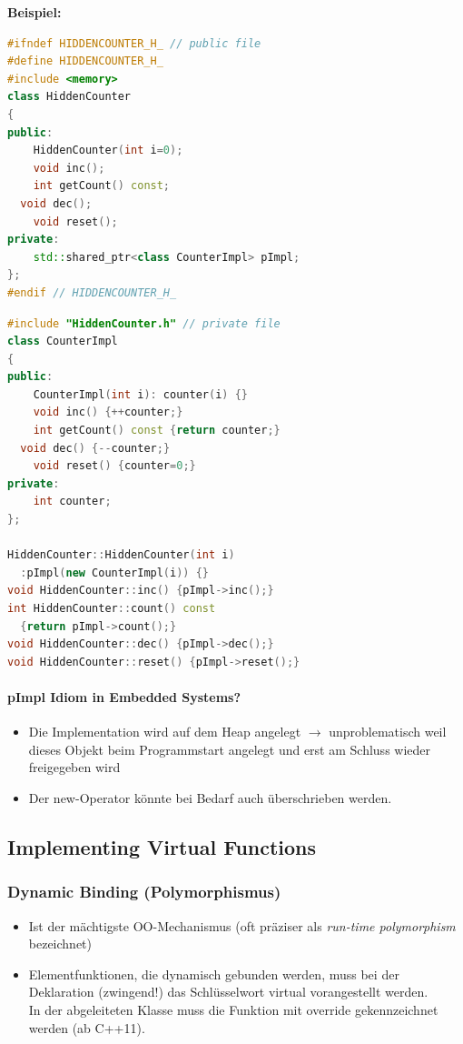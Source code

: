 \textbf{Beispiel:}
\begin{multicols}{2}
\begin{lstlisting}[language=C++]
#ifndef HIDDENCOUNTER_H_ // public file
#define HIDDENCOUNTER_H_
#include <memory>
class HiddenCounter
{
public:
	HiddenCounter(int i=0);
	void inc();
	int getCount() const;
  void dec();
	void reset();
private:
	std::shared_ptr<class CounterImpl> pImpl;
};
#endif // HIDDENCOUNTER_H_
\end{lstlisting}
\vfill\null
\columnbreak
\begin{lstlisting}[language=C++]
#include "HiddenCounter.h" // private file
class CounterImpl
{
public:
	CounterImpl(int i): counter(i) {}
	void inc() {++counter;}
	int getCount() const {return counter;}
  void dec() {--counter;}
	void reset() {counter=0;}
private:
	int counter;
};

HiddenCounter::HiddenCounter(int i)
  :pImpl(new CounterImpl(i)) {}
void HiddenCounter::inc() {pImpl->inc();}
int HiddenCounter::count() const
  {return pImpl->count();}
void HiddenCounter::dec() {pImpl->dec();}
void HiddenCounter::reset() {pImpl->reset();}
\end{lstlisting}
\end{multicols}

\paragraph{pImpl Idiom in Embedded Systems?}
\begin{itemize}
  \item Die Implementation wird auf dem Heap angelegt $\rightarrow$ unproblematisch weil dieses Objekt beim Programmstart angelegt und erst am Schluss wieder freigegeben wird
  \item Der new-Operator könnte bei Bedarf auch überschrieben werden.
\end{itemize}

\subsection{Implementing Virtual Functions}
\subsubsection{Dynamic Binding (Polymorphismus)}
\begin{itemize}
  \item Ist der mächtigste OO-Mechanismus (oft präziser als \textit{run-time polymorphism} bezeichnet)
  \item Elementfunktionen, die dynamisch gebunden werden, muss bei der Deklaration (zwingend!) das Schlüsselwort virtual vorangestellt werden.\\
  In der abgeleiteten Klasse muss die Funktion mit override gekennzeichnet werden (ab C++11).
\end{itemize}

